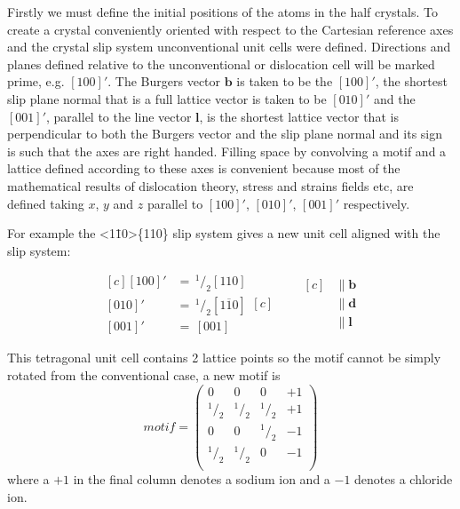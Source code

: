 Firstly we must define the initial positions of the atoms in the half crystals. To create a crystal conveniently oriented with respect to the Cartesian reference axes and the crystal slip system unconventional unit cells were defined. Directions and planes defined relative to the unconventional or dislocation cell will be marked prime, e.g. $[100]'$. The Burgers vector $\mathbf{b}$ is taken to be the $[100]'$, the shortest slip plane normal that is a full lattice vector is taken to be $[010]'$ and the $[001]'$, parallel to the line vector $\mathbf{l}$, is the shortest lattice vector that is perpendicular to both the Burgers vector and the slip plane normal and its sign is such that the axes are right handed. Filling space by convolving a motif and a lattice defined according to these axes is convenient because most of the mathematical results of dislocation theory, stress and strains fields etc, are defined taking $x$, $y$ and $z$ parallel to $[100]'$, $[010]'$, $[001]'$ respectively.

For example the  <1\={1}0>\{110\} slip system gives a new unit cell aligned with the slip system:

\begin{equation*}
\begin{aligned}[c]
{[100]}' &=\, ^{1}\!/_{2} [110]   \\
{[010]}' &=\, ^{1}\!/_{2} [1\overline{1}0]   \\
{[001]}' &=\, [001]   
\end{aligned}[c]
\qquad
\begin{aligned}[c]
&\parallel \mathbf{b} \\
&\parallel \mathbf{d} \\
&\parallel \mathbf{l}
\end{aligned}
\end{equation*}



This tetragonal unit cell contains 2 lattice points so the motif cannot be simply rotated from the conventional case, a new motif is
$$
motif = \begin{pmatrix}
0 & 0 & 0 & +1 \\
^{1}\!/_{2} & ^{1}\!/_{2} & ^{1}\!/_{2} & +1 \\
0 & 0 & ^{1}\!/_{2} & -1 \\
^{1}\!/_{2} & ^{1}\!/_{2} & 0 & -1 \\
\end{pmatrix}
$$
where a $+1$ in the final column denotes a sodium ion and a $-1$ denotes a chloride ion.



